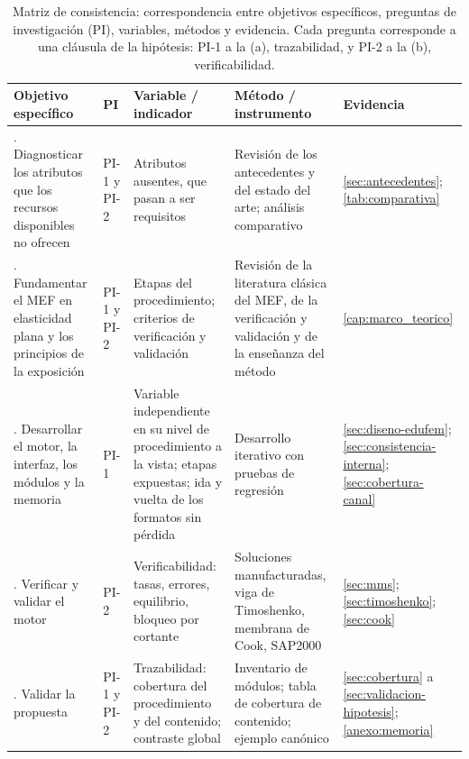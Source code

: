 \begin{table}[htbp]
\centering
\caption[Matriz de consistencia de la investigación.]{Matriz de consistencia: correspondencia entre objetivos específicos, preguntas de investigación (PI), variables, métodos y evidencia. Cada pregunta corresponde a una cláusula de la hipótesis: PI-1 a la (a), trazabilidad, y PI-2 a la (b), verificabilidad.}
\label{tab:consistencia}
{\footnotesize
\setlength{\tabcolsep}{3pt}
\renewcommand{\arraystretch}{1.15}
\begin{tabular}{@{}>{\raggedright\arraybackslash}p{3.0cm}>{\raggedright\arraybackslash}p{1.3cm}>{\raggedright\arraybackslash}p{3.0cm}>{\raggedright\arraybackslash}p{3.6cm}>{\raggedright\arraybackslash}p{2.7cm}@{}}
\toprule
\textbf{Objetivo específico} & \textbf{PI} & \textbf{Variable / indicador} & \textbf{Método / instrumento} & \textbf{Evidencia} \\
\midrule
1. Diagnosticar los atributos que los recursos disponibles no ofrecen & PI-1 y PI-2 & Atributos ausentes, que pasan a ser requisitos & Revisión de los antecedentes y del estado del arte; análisis comparativo & \autoref{sec:antecedentes}; \autoref{tab:comparativa} \\
2. Fundamentar el MEF en elasticidad plana y los principios de la exposición & PI-1 y PI-2 & Etapas del procedimiento; criterios de verificación y validación & Revisión de la literatura clásica del MEF, de la verificación y validación y de la enseñanza del método & \autoref{cap:marco_teorico} \\
3. Desarrollar el motor, la interfaz, los módulos y la memoria & PI-1 & Variable independiente en su nivel de procedimiento a la vista; etapas expuestas; ida y vuelta de los formatos sin pérdida & Desarrollo iterativo con pruebas de regresión & \autoref{sec:diseno-edufem}; \autoref{sec:consistencia-interna}; \autoref{sec:cobertura-canal} \\
4. Verificar y validar el motor & PI-2 & Verificabilidad: tasas, errores, equilibrio, bloqueo por cortante & Soluciones manufacturadas, viga de Timoshenko, membrana de Cook, SAP2000 & \autoref{sec:mms}; \autoref{sec:timoshenko}; \autoref{sec:cook} \\
5. Validar la propuesta & PI-1 y PI-2 & Trazabilidad: cobertura del procedimiento y del contenido; contraste global & Inventario de módulos; tabla de cobertura de contenido; ejemplo canónico & \autoref{sec:cobertura} a \autoref{sec:validacion-hipotesis}; \autoref{anexo:memoria} \\
\bottomrule
\end{tabular}}
\end{table}

